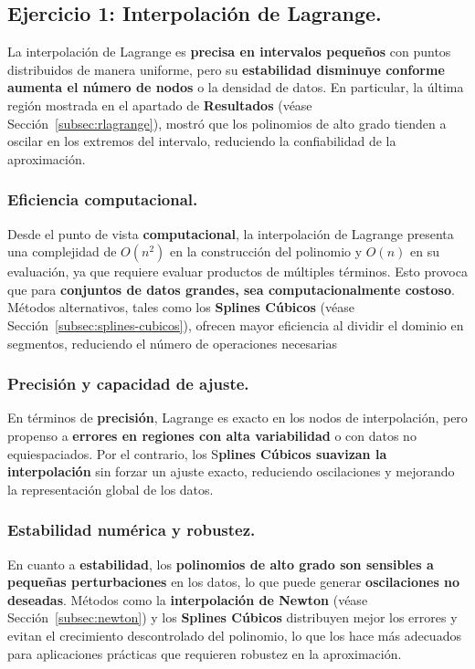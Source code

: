 \documentclass{article}
\begin{document}
\subsection{Ejercicio 1: Interpolación de Lagrange.}
\label{subsec:dlagrange}
La interpolación de Lagrange es \textbf{precisa en intervalos pequeños} con puntos distribuidos de manera uniforme, pero su \textbf{estabilidad disminuye conforme aumenta el número de nodos} o la densidad de datos. En particular, la última región mostrada en el apartado de \textbf{Resultados} (véase Sección~\ref{subsec:rlagrange}), mostró que los polinomios de alto grado tienden a oscilar en los extremos del intervalo, reduciendo la confiabilidad de la aproximación.

\subsubsection*{Eficiencia computacional.}
Desde el punto de vista \textbf{computacional}, la interpolación de Lagrange presenta una complejidad de $O(n^2)$ en la construcción del polinomio y $O(n)$ en su evaluación, ya que requiere evaluar productos de múltiples términos. Esto provoca que para \textbf{conjuntos de datos grandes, sea computacionalmente costoso}. Métodos alternativos, tales como los \textbf{Splines Cúbicos} (véase Sección~\ref{subsec:splines-cubicos}), ofrecen mayor eficiencia al dividir el dominio en segmentos, reduciendo el número de operaciones necesarias

\subsubsection*{Precisión y capacidad de ajuste.}
En términos de \textbf{precisión}, Lagrange es exacto en los nodos de interpolación, pero propenso a \textbf{errores en regiones con alta variabilidad} o con datos no equiespaciados. Por el contrario, los S\textbf{plines Cúbicos suavizan la interpolación} sin forzar un ajuste exacto, reduciendo oscilaciones y mejorando la representación global de los datos.

\subsubsection*{Estabilidad numérica y robustez.}
En cuanto a \textbf{estabilidad}, los \textbf{polinomios de alto grado son sensibles a pequeñas perturbaciones} en los datos, lo que puede generar \textbf{oscilaciones no deseadas}. Métodos como la \textbf{interpolación de Newton} (véase Sección~\ref{subsec:newton}) y los \textbf{Splines Cúbicos} distribuyen mejor los errores y evitan el crecimiento descontrolado del polinomio, lo que los hace más adecuados para aplicaciones prácticas que requieren robustez en la aproximación.
\end{document}

